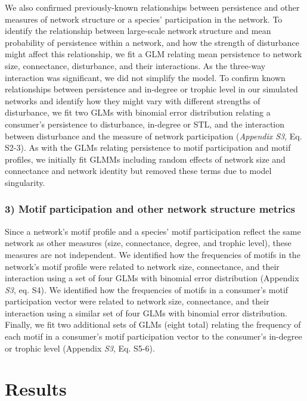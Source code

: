 \documentclass[12pt]{article}
\begin{document}
\begin{spacing}{2.0}
            We also confirmed previously-known relationships between persistence and other measures of network structure or a species' participation in the network.
            To identify the relationship between large-scale network structure and mean probability of persistence within a network, and how the strength of disturbance might affect this relationship, we fit a GLM relating mean persistence to network size, connectance, disturbance, and their interactions.
            As the three-way interaction was significant, we did not simplify the model. 
            To confirm known relationships between persistence and in-degree or trophic level in our simulated networks and identify how they might vary with different strengths of disturbance, we fit two GLMs with binomial error distribution relating a consumer's persistence to disturbance, in-degree or STL, and the interaction between disturbance and the measure of network participation (\emph{Appendix S3}, Eq. S2-3).
            As with the GLMs relating persistence to motif participation and motif profiles, we initially fit GLMMs including random effects of network size and connectance and network identity but removed these terms due to model singularity.



        \subsubsection*{3) Motif participation and other network structure metrics}

            Since a network's motif profile and a species' motif participation reflect the same network as other measures (size, connectance, degree, and trophic level), these measures are not independent. 
            We identified how the frequencies of motifs in the network's motif profile were related to network size, connectance, and their interaction using a set of four GLMs with binomial error distribution (Appendix \emph{S3}, eq. S4).
            We identified how the frequencies of motifs in a consumer's motif participation vector were related to network size, connectance, and their interaction using a similar set of four GLMs with binomial error distribution.
            Finally, we fit two additional sets of GLMs (eight total) relating the frequency of each motif in a consumer's motif participation vector to the consumer's in-degree or trophic level (Appendix \emph{S3}, Eq. S5-6).
        
        
\section*{Results}


\end{spacing}
\end{document}
